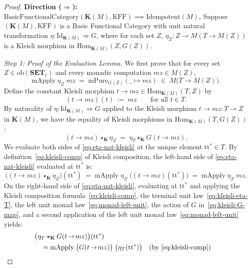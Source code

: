 \documentclass[11pt,a4paper]{article}
\theoremstyle{definition}
\theoremstyle{remark}
\newcommand{\Set}{\mathbf{SET}}
\newcommand{\Hom}{\mathrm{Hom}}
\newcommand{\Id}{\mathrm{Id}}
\newcommand{\KFF}{\mathrm{KFF}}
\newcommand{\K}{\mathbf{K}}
\newcommand{\ttstar}{\mathrm{tt}^*}
\newcommand{\starK}{\mathbin{\star_{\K}}}
\begin{document}
\begin{proof}

\textbf{Direction ($\Longrightarrow$): $\mathrm{BasicFunctionalCategory}(\K(M), \KFF) \implies \mathrm{Idempotent}(M)$.}
Suppose $(\K(M), \KFF)$ is a Basic Functional Category with unit natural transformation
$\eta : \Id_{\K(M)} \Rightarrow G$, where for each set $Z$, $\eta_Z : Z \to M(T \to M(Z))$ is a
Kleisli morphism in $\Hom_{\K(M)}(Z, G(Z))$.

\emph{Step 1: Proof of the Evaluation Lemma.}
We first prove that for every set $Z \in \mathrm{ob}(\Set_\ell)$ and every monadic computation
$mz \in M(Z)$,
\begin{equation}\label{eq:eval-lemma}
  \mathrm{mApply}\;\eta_Z\;mz \;=\; \mathrm{mPure}_{G(Z)}(\_ \mapsto mz)
  \;\in\; M\bigl(T \to M(Z)\bigr).
\end{equation}
Define the constant Kleisli morphism $t\!\to\!mz \in \Hom_{\K(M)}(T, Z)$ by
\[
  (t\!\to\!mz)(t) \;\coloneqq\; mz \qquad\text{for all } t \in T.
\]
By naturality of $\eta : \Id_{\K(M)} \Rightarrow G$ applied to the Kleisli morphism
$t\!\to\!mz : T \to Z$ in $\K(M)$, we have the equality of Kleisli morphisms in
$\Hom_{\K(M)}(T, G(Z))$:
\begin{equation}\label{eq:eta-nat-kleisli}
  (t\!\to\!mz) \starK \eta_Z \;=\; \eta_T \starK G(t\!\to\!mz).
\end{equation}
We evaluate both sides of \eqref{eq:eta-nat-kleisli} at the unique element $\ttstar \in T$.
By definition~\eqref{eq:kleisli-comp} of Kleisli composition, the left-hand side of
\eqref{eq:eta-nat-kleisli} evaluated at $\ttstar$ is:
\begin{equation}\label{eq:eval-lhs}
  \bigl((t\!\to\!mz) \starK \eta_Z\bigr)(\ttstar)
  \;=\; \mathrm{mApply}\;\eta_Z\;\bigl((t\!\to\!mz)(\ttstar)\bigr)
  \;=\; \mathrm{mApply}\;\eta_Z\;mz.
\end{equation}
On the right-hand side of \eqref{eq:eta-nat-kleisli}, evaluating at $\ttstar$ and applying the
Kleisli composition formula~\eqref{eq:kleisli-comp}, the terminal unit law~\eqref{eq:kleisli-eta-T},
the left unit monad law~\eqref{eq:monad-left-unit}, the action of $G$ in~\eqref{eq:kleisli-G-map}, and
a second application of the left unit monad law~\eqref{eq:monad-left-unit} yields:
\begin{align}
  &\bigl(\eta_T \starK G(t\!\to\!mz)\bigr)(\ttstar) \nonumber \\
  &\quad= \mathrm{mApply}\;\bigl(G(t\!\to\!mz)\bigr)\;\bigl(\eta_T(\ttstar)\bigr)
    &&\text{(by \eqref{eq:kleisli-comp})} \nonumber \\

\end{align}
\end{proof}
\end{document}
